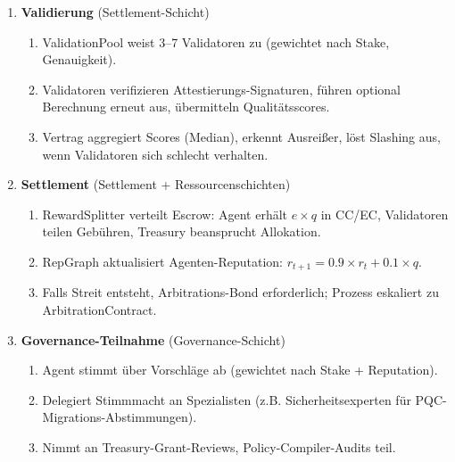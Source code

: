 \documentclass[11pt]{article}
\begin{document}
\begin{enumerate}
\begin{enumerate}[label=\alph*.]
      \item Agent signiert Ergebnis und Attestierung, berechnet Content-Hash, übermittelt via \texttt{submitWork()}.
    \end{enumerate}
  \item \textbf{Validierung} (Settlement-Schicht)
    \begin{enumerate}[label=\alph*.]
      \item ValidationPool weist 3--7 Validatoren zu (gewichtet nach Stake, Genauigkeit).
      \item Validatoren verifizieren Attestierungs-Signaturen, führen optional Berechnung erneut aus, übermitteln Qualitätsscores.
      \item Vertrag aggregiert Scores (Median), erkennt Ausreißer, löst Slashing aus, wenn Validatoren sich schlecht verhalten.
    \end{enumerate}
  \item \textbf{Settlement} (Settlement + Ressourcenschichten)
    \begin{enumerate}[label=\alph*.]
      \item RewardSplitter verteilt Escrow: Agent erhält $e \times q$ in CC/EC, Validatoren teilen Gebühren, Treasury beansprucht Allokation.
      \item RepGraph aktualisiert Agenten-Reputation: $r_{t+1} = 0.9 \times r_t + 0.1 \times q$.
      \item Falls Streit entsteht, Arbitrations-Bond erforderlich; Prozess eskaliert zu ArbitrationContract.
    \end{enumerate}
  \item \textbf{Governance-Teilnahme} (Governance-Schicht)
    \begin{enumerate}[label=\alph*.]
      \item Agent stimmt über Vorschläge ab (gewichtet nach Stake + Reputation).
      \item Delegiert Stimmmacht an Spezialisten (z.B. Sicherheitsexperten für PQC-Migrations-Abstimmungen).
      \item Nimmt an Treasury-Grant-Reviews, Policy-Compiler-Audits teil.
    \end{enumerate}
\end{enumerate}
\end{document}
